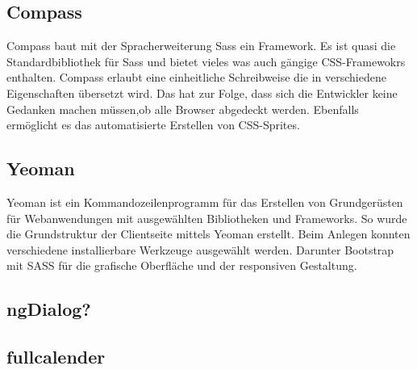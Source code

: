 \subsection{Compass}
Compass baut mit der Spracherweiterung Sass ein Framework. Es ist quasi die Standardbibliothek für Sass und bietet vieles was auch gängige CSS-Framewokrs enthalten. Compass erlaubt eine einheitliche Schreibweise die in verschiedene Eigenschaften übersetzt wird. Das hat zur Folge, dass sich die Entwickler keine Gedanken machen müssen,ob alle Browser abgedeckt werden. Ebenfalls ermöglicht es das automatisierte Erstellen von CSS-Sprites. 

\subsection{Yeoman}
Yeoman ist ein Kommandozeilenprogramm für das Erstellen von Grundgerüsten für Webanwendungen mit ausgewählten Bibliotheken und Frameworks. So wurde die Grundstruktur der Clientseite mittels Yeoman erstellt. Beim Anlegen konnten verschiedene installierbare Werkzeuge ausgewählt werden. Darunter Bootstrap mit SASS für die grafische Oberfläche und der responsiven Gestaltung.

\subsection{ngDialog?}

\subsection{fullcalender}

